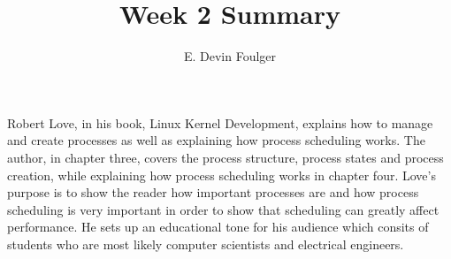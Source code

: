 \documentclass[journal, 10pt]{article}
\def\name{E. Devin Foulger}
\begin{document}
\title{Week 2 Summary}
\author{\name}
\date{} %

\maketitle

Robert Love, in his book, Linux Kernel Development, explains how to manage and create processes as well as 
explaining how process scheduling works. The author, in chapter three, covers the process structure, process states 
and process creation, while explaining how process scheduling works in chapter four. Love's purpose is to show the 
reader how important processes are and how process scheduling is very important in order to show that scheduling can
greatly affect performance. He sets up an educational tone for his audience which consits of students who are most 
likely computer scientists and electrical engineers.
\end{document}

